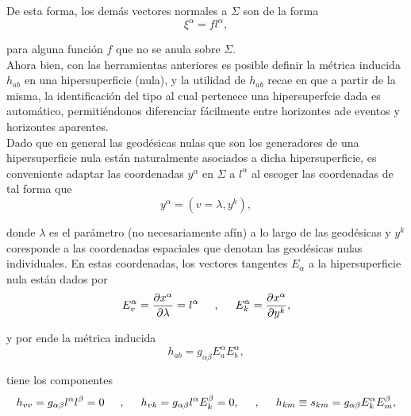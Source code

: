 \documentclass[16pt,a4paper]{article}
\numberwithin{equation}{section}
\theoremstyle{definition}
\begin{document}
De esta forma, los demás vectores normales a $\Sigma$ son de la forma
\begin{equation*}
\xi^\alpha = fl^\alpha,
\end{equation*}

para alguna función $f$ que no se anula sobre $\Sigma$.\\

Ahora bien, con las herramientas anteriores es posible definir la métrica inducida $h_{ab}$ en una hipersuperficie (nula), y la utilidad de $h_{ab}$ recae en que a partir de la misma, la identificación del tipo al cual pertenece una hipersuperfcie dada es automático, permitiéndonos diferenciar fácilmente entre horizontes ade eventos y horizontes aparentes.\\

Dado que en general las geodésicas nulas que son los generadores de una hipersuperficie nula están naturalmente asociados a dicha hipersuperficie, es conveniente adaptar las coordenadas $y^\alpha$ en $\Sigma$ a $l^\alpha$ al escoger las coordenadas de tal forma que 
\begin{equation*}
y^\alpha = (v = \lambda, y^k),
\end{equation*}

donde $\lambda$ es el parámetro (no necesariamente afín) a lo largo de las geodésicas y $y^k$ coresponde a las coordenadas espaciales que denotan las geodésicas nulas individuales. En estas coordenadas, los vectores tangentes $E_\alpha$ a la hipersuperficie nula están dados por
\begin{equation*}
E^{\alpha}_{v} = \frac{\partial x^\alpha}{\partial \lambda} = l^\alpha \hspace{.5cm}, \hspace{.5cm} E^{\alpha}_{k} =\frac{\partial x^\alpha}{\partial y^k},
\end{equation*}

y por ende la métrica inducida
\begin{equation*}
h_{ab} = g_{\alpha \beta} E^{\alpha}_{a} E^{\alpha}_{b},
\end{equation*}

tiene los componentes 
\begin{equation*}
h_{vv} = g_{\alpha \beta} l^\alpha l^\beta = 0 \hspace{.5cm},\hspace{.5cm} h_{vk} = g_{\alpha \beta} l^\alpha E^{\beta}_{k} = 0, \hspace{.5cm},\hspace{.5cm} h_{km} \equiv s_{km} = g_{\alpha \beta} E^{\alpha}_{k} E^{\beta}_{m},
\end{equation*}
\end{document}
